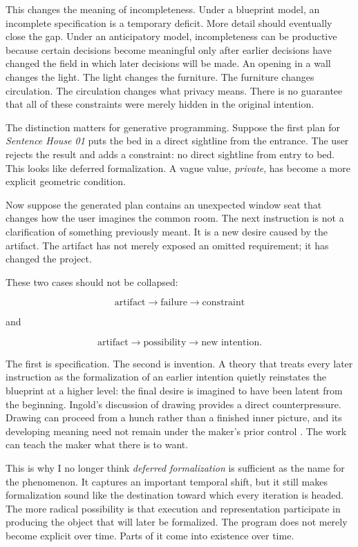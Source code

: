 \documentclass[11pt]{article}
\begin{document}
This changes the meaning of incompleteness. Under a blueprint model, an incomplete specification is a temporary deficit. More detail should eventually close the gap. Under an anticipatory model, incompleteness can be productive because certain decisions become meaningful only after earlier decisions have changed the field in which later decisions will be made. An opening in a wall changes the light. The light changes the furniture. The furniture changes circulation. The circulation changes what privacy means. There is no guarantee that all of these constraints were merely hidden in the original intention.

The distinction matters for generative programming. Suppose the first plan for \emph{Sentence House 01} puts the bed in a direct sightline from the entrance. The user rejects the result and adds a constraint: no direct sightline from entry to bed. This looks like deferred formalization. A vague value, \emph{private}, has become a more explicit geometric condition.

Now suppose the generated plan contains an unexpected window seat that changes how the user imagines the common room. The next instruction is not a clarification of something previously meant. It is a new desire caused by the artifact. The artifact has not merely exposed an omitted requirement; it has changed the project.

These two cases should not be collapsed:

\[
\text{artifact} \rightarrow \text{failure} \rightarrow \text{constraint}
\]

and

\[
\text{artifact} \rightarrow \text{possibility} \rightarrow \text{new intention}.
\]

The first is specification. The second is invention. A theory that treats every later instruction as the formalization of an earlier intention quietly reinstates the blueprint at a higher level: the final desire is imagined to have been latent from the beginning. Ingold's discussion of drawing provides a direct counterpressure. Drawing can proceed from a hunch rather than a finished inner picture, and its developing meaning need not remain under the maker's prior control \citep[126--127]{ingold2013making}. The work can teach the maker what there is to want.

This is why I no longer think \emph{deferred formalization} is sufficient as the name for the phenomenon. It captures an important temporal shift, but it still makes formalization sound like the destination toward which every iteration is headed. The more radical possibility is that execution and representation participate in producing the object that will later be formalized. The program does not merely become explicit over time. Parts of it come into existence over time.
\end{document}
